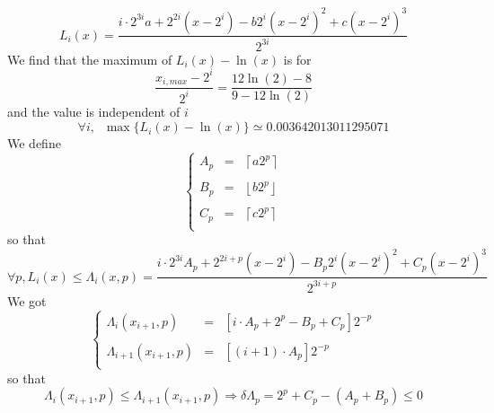 \documentclass[aps]{revtex4}
\newcommand{\myfloor}[1]{{\left\lfloor#1\right\rfloor}}
\newcommand{\myceil}[1]{{\left\lceil#1\right\rceil}}
\begin{document}
\begin{equation}
	L_i(x) = \dfrac{
	i\cdot2^{3i}a
	+ 2^{2i}\left(x-2^i\right)
	- b 2^{i}\left(x-2^i\right)^2
	+ c      \left(x-2^i\right)^3
	}
	{2^{3i}} 
\end{equation}
We find that the maximum of $L_i(x)-\ln(x)$ is for 
\begin{equation}
	\dfrac{x_{i,max}-2^i}{2^i} = \dfrac{12\ln(2)-8}{9-12\ln(2)}
\end{equation}
and the value is independent of $i$
\begin{equation}
	\forall i, \;\; \max\lbrace L_i(x)-\ln(x)\rbrace \simeq 0.003642013011295071
\end{equation}
We define 
\begin{equation}
\left\lbrace
\begin{array}{rcl}
A_p & = & \myceil{a 2^p} \\
\\
B_p & = & \myfloor{b 2^p}\\
\\
C_p & = & \myceil{c 2^p} \\
\end{array}
\right.
\end{equation}
so that
\begin{equation}
	\forall p, L_i(x) \leq 
	\Lambda_i(x,p) =
	 \dfrac{
	i\cdot2^{3i}A_p
	+ 2^{2i+p}\left(x-2^i\right)
	- B_p 2^{i}\left(x-2^i\right)^2
	+ C_p      \left(x-2^i\right)^3
	 }{2^{3i+p}}
\end{equation}
We got
\begin{equation}
\left\lbrace
\begin{array}{rcl}
	\Lambda_i(x_{i+1},p) & = & \left[ i \cdot A_p + 2^p - B_p + C_p \right] 2^{-p}\\
	\\
	\Lambda_{i+1}(x_{i+1},p) & = & \left[  (i+1) \cdot A_p \right] 2^{-p} \\
\end{array}
\right.
\end{equation}
so that
\begin{equation}
	\Lambda_i(x_{i+1},p) \leq \Lambda_{i+1}(x_{i+1},p) \Rightarrow \delta\Lambda_p = 2^p + C_p - (A_p+B_p) \leq 0
\end{equation}
\end{document}

